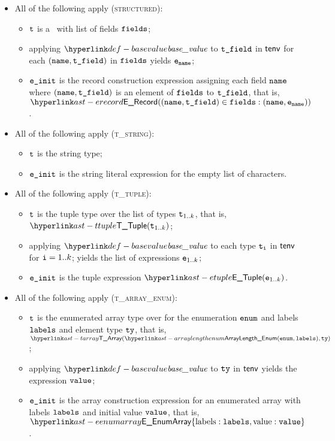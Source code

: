 \begin{itemize}
    \item All of the following apply (\textsc{structured}):
    \begin{itemize}
        \item $\texttt{t}$ is a \structuredtype\ with list of fields $\texttt{fields}$;
        \item applying $\basevalue$ to $\texttt{t\_field}$ in $\textsf{tenv}$ for each $(\texttt{name}, \texttt{t\_field})$ in $\texttt{fields}$
              yields $\texttt{e}_{\texttt{name}}$\ProseOrTypeError;
        \item $\texttt{e\_init}$ is the record construction expression assigning each field $\texttt{name}$
              where $(\texttt{name}, \texttt{t\_field})$ is an element of $\texttt{fields}$ to $\texttt{t\_field}$, that is, \\
              $\ERecord((\name, \vtefield) \in \fields: (\name, \ve_\name))$.
    \end{itemize}

    \item All of the following apply (\textsc{t\_string}):
    \begin{itemize}
        \item $\texttt{t}$ is the string type;
        \item $\texttt{e\_init}$ is the string literal expression for the empty list of characters.
    \end{itemize}

    \item All of the following apply (\textsc{t\_tuple}):
    \begin{itemize}
        \item $\texttt{t}$ is the tuple type over the list of types $\texttt{t}_{1..k}$, that is, $\TTuple(\vt_{1..k})$;
        \item applying $\basevalue$ to each type $\texttt{t}_{\texttt{i}}$ in $\textsf{tenv}$ for $\texttt{i}=1..k$; yields the list of expressions $\texttt{e}_{1..k}$;
        \item $\texttt{e\_init}$ is the tuple expression $\ETuple(\ve_{1..k})$.
    \end{itemize}

    \item All of the following apply (\textsc{t\_array\_enum}):
    \begin{itemize}
        \item $\texttt{t}$ is the enumerated array type over for the enumeration $\texttt{enum}$ and labels $\texttt{labels}$ and element type $\texttt{ty}$,
              that is, $\TArray(\ArrayLengthEnum(\venum, \vlabels), \tty)$ ;
        \item applying $\basevalue$ to $\texttt{ty}$ in $\textsf{tenv}$ yields the expression $\texttt{value}$\ProseOrTypeError;
        \item $\texttt{e\_init}$ is the array construction expression for an enumerated array with labels $\texttt{labels}$ and initial value $\texttt{value}$,
              that is, $\EEnumArray\{\EArrayLabels: \vlabels, \EArrayValue: \vvalue\}$.
    \end{itemize}


\end{itemize}
